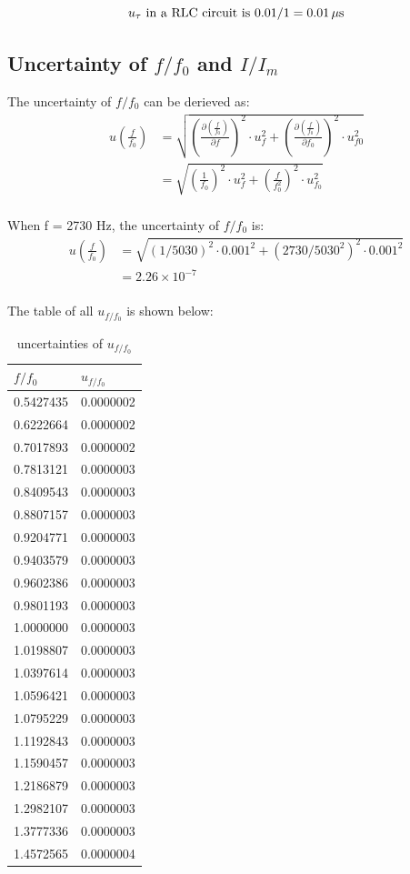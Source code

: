 \documentclass[12pt, a4paper]{article}
\begin{document}
$$u_{\tau} \text{ in a RLC circuit is } 0.01/1=0.01\,\rm{\mu s}$$

\subsection{Uncertainty of $f/f_0$ and $I/I_m$}
The uncertainty of $f/f_0$ can be derieved as:
\begin{align*}
	u\left(\frac{f}{f_0}\right) &= \sqrt{\left(\frac{\partial(\frac{f}{f_0})}{\partial f}\right)^2\cdot u_f^2 + \left(\frac{\partial(\frac{f}{f_0})}{\partial f_0}\right)^2\cdot u_{f0}^2}\\
								&= \sqrt{\left(\frac{1}{f_0}\right)^2\cdot u_f^2 + \left(\frac{f}{f_0^2}\right)^2\cdot u^2_{f_0}}\\
\end{align*}

When f = 2730 Hz, the uncertainty of $f/f_0$ is:
\begin{align*}
	u\left(\frac{f}{f_0}\right) &= \sqrt{(1/5030)^2 \cdot 0.001^2 + (2730/5030^2)^2 \cdot 0.001^2}\\
								&= 2.26 \times 10^{-7}\\
\end{align*}

The table of all $u_{f/f_0}$ is shown below:
\begin{table}[H]
	\centering
	\begin{tabular}{|l|l|}
	\hline
	$f/f_0$    & $u_{f/f_0}$ \\ \hline
	0.5427435 & 0.0000002     \\ \hline
	0.6222664 & 0.0000002     \\ \hline
	0.7017893 & 0.0000002     \\ \hline
	0.7813121 & 0.0000003     \\ \hline
	0.8409543 & 0.0000003     \\ \hline
	0.8807157 & 0.0000003     \\ \hline
	0.9204771 & 0.0000003     \\ \hline
	0.9403579 & 0.0000003     \\ \hline
	0.9602386 & 0.0000003     \\ \hline
	0.9801193 & 0.0000003     \\ \hline
	1.0000000 & 0.0000003     \\ \hline
	1.0198807 & 0.0000003     \\ \hline
	1.0397614 & 0.0000003     \\ \hline
	1.0596421 & 0.0000003     \\ \hline
	1.0795229 & 0.0000003     \\ \hline
	1.1192843 & 0.0000003     \\ \hline
	1.1590457 & 0.0000003     \\ \hline
	1.2186879 & 0.0000003     \\ \hline
	1.2982107 & 0.0000003     \\ \hline
	1.3777336 & 0.0000003     \\ \hline
	1.4572565 & 0.0000004     \\ \hline
	\end{tabular}
	\caption{uncertainties of $u_{f/f_0}$}
\end{table}
\end{document}
